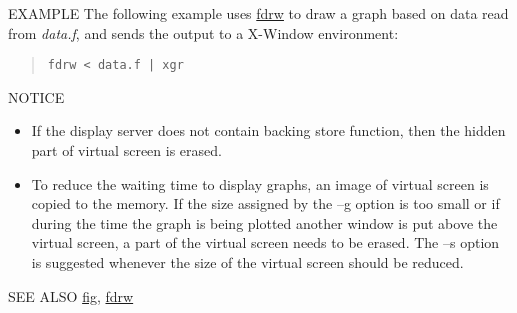 \begin{options}
\end{options}
\begin{qsection}{EXAMPLE}
The following example uses \hyperlink{fdrw}{fdrw} to draw a graph based on data read
from {\em data.f}, and sends the output to a X-Window environment:
\begin{quote}
 \verb!fdrw < data.f | xgr!
\end{quote}
\end{qsection}
\begin{qsection}{NOTICE}
\begin{itemize}
\item If the display server does not contain backing store function,
then the hidden part of virtual screen is erased.

\item To reduce the waiting time to display graphs,
an image of virtual screen is copied to the memory.
If the size assigned by the --g option is too small
or if during the time the graph is being plotted another window
is put above the virtual screen, a part of the virtual screen
needs to be erased.
The --s option is suggested whenever the size of
the virtual screen should be reduced.
\end{itemize}

\end{qsection}
\begin{qsection}{SEE ALSO}
\hyperlink{fig}{fig},
\hyperlink{fdrw}{fdrw}
\end{qsection}

